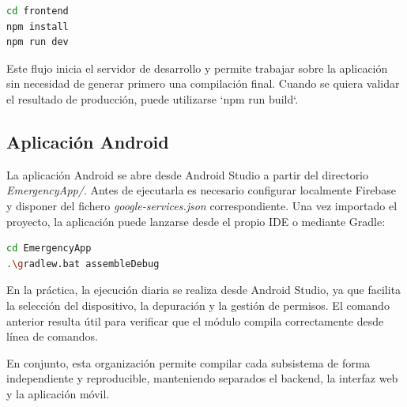 \begin{lstlisting}[language=Bash]
cd frontend
npm install
npm run dev
\end{lstlisting}

Este flujo inicia el servidor de desarrollo y permite trabajar sobre la aplicación sin necesidad de generar primero una compilación final. Cuando se quiera validar el resultado de producción, puede utilizarse `npm run build`.

\subsection{Aplicación Android}

La aplicación Android se abre desde Android Studio a partir del directorio \textit{EmergencyApp/}. Antes de ejecutarla es necesario configurar localmente Firebase y disponer del fichero \textit{google-services.json} correspondiente. Una vez importado el proyecto, la aplicación puede lanzarse desde el propio IDE o mediante Gradle:

\begin{lstlisting}[language=Bash]
cd EmergencyApp
.\gradlew.bat assembleDebug
\end{lstlisting}

En la práctica, la ejecución diaria se realiza desde Android Studio, ya que facilita la selección del dispositivo, la depuración y la gestión de permisos. El comando anterior resulta útil para verificar que el módulo compila correctamente desde línea de comandos.

En conjunto, esta organización permite compilar cada subsistema de forma independiente y reproducible, manteniendo separados el backend, la interfaz web y la aplicación móvil.
